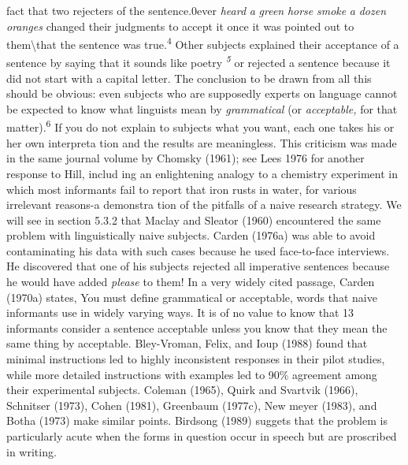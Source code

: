 \begin{styleStandard}
fact that two rejecters of the sentence.0ever \textit{heard}\textit{ }\textit{a}\textit{ }\textit{green}\textit{ }\textit{horse}\textit{ }\textit{smoke}\textit{ }\textit{a}\textit{ }\textit{dozen}\textit{ }\textit{oranges}\textit{ }changed their judgments to accept it once it was pointed out to them{\textbackslash}that the sentence was true.\textsuperscript{4}\textsuperscript{ }Other subjects explained their acceptance of a sentence by saying that {\textquotedbl}it sounds like poetry{\textquotedbl} \textit{\textsuperscript{5}}\textit{\textsuperscript{ }}or rejected a sentence because it did not start with a capital letter. The conclusion to be drawn from all this should be obvious: even subjects who are supposedly experts on language cannot be expected to know what linguists mean by \textit{grammatical}\textit{ }(or \textit{acceptable,}\textit{ }for that matter).\textsuperscript{6}\textsuperscript{ }If you do not explain to subjects what you want, each one takes his or her own interpreta\- tion and the results are meaningless. This criticism was made in the same journal volume by Chomsky (1961); see Lees 1976 for another response to Hill, includ\- ing an enlightening analogy to a chemistry experiment in which most informants fail to report that iron rusts in water, for various irrelevant reasons{}-a demonstra\- tion of the pitfalls of a naive research strategy. We will see in section 5.3.2 that Maclay and Sleator (1960) encountered the same problem with linguistically naive subjects. Carden (1976a) was able to avoid contaminating his data with such cases because he used face-to-face interviews. He discovered that one of his subjects rejected all imperative sentences because he would have added \textit{please}\textit{ }to them! In a very widely cited passage, Carden (1970a) states, {\textquotedbl}You must define {\textquotesingle}grammatical{\textquotesingle} or {\textquotesingle}acceptable,{\textquotesingle} words that naive informants use in widely varying ways. It is of no value to know that 13 informants consider a sentence acceptable unless you know that they mean the same thing by {\textquotesingle}acceptable.{\textquotesingle}{\textquotedbl} Bley-Vroman, Felix, and Ioup (1988) found that minimal instructions led to highly inconsistent responses in their pilot studies, while more detailed instructions with examples led to 90\% agreement among their experimental subjects. Coleman (1965), Quirk and Svartvik (1966), Schnitser (1973), Cohen (1981), Greenbaum (1977c), New\- meyer (1983), and Botha (1973) make similar points. Birdsong (1989) suggets that the problem is particularly acute when the forms in question occur in speech but are proscribed in writing.
\end{styleStandard}



